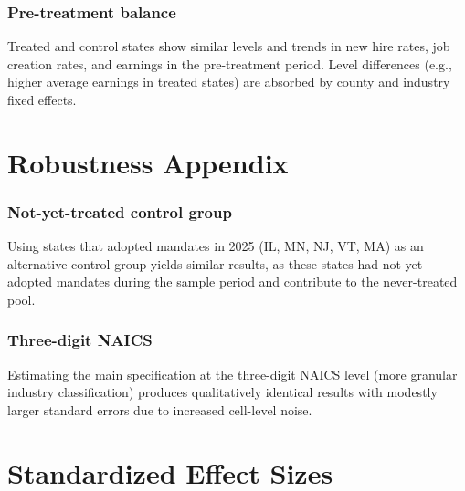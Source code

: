 \documentclass[12pt]{article}
\begin{document}
\subsubsection*{Pre-treatment balance} Treated and control states show similar levels and trends in new hire rates, job creation rates, and earnings in the pre-treatment period. Level differences (e.g., higher average earnings in treated states) are absorbed by county and industry fixed effects.

\section{Robustness Appendix}

\subsubsection*{Not-yet-treated control group} Using states that adopted mandates in 2025 (IL, MN, NJ, VT, MA) as an alternative control group yields similar results, as these states had not yet adopted mandates during the sample period and contribute to the never-treated pool.

\subsubsection*{Three-digit NAICS} Estimating the main specification at the three-digit NAICS level (more granular industry classification) produces qualitatively identical results with modestly larger standard errors due to increased cell-level noise.

\section{Standardized Effect Sizes}
\label{sec:sde}


\end{document}
